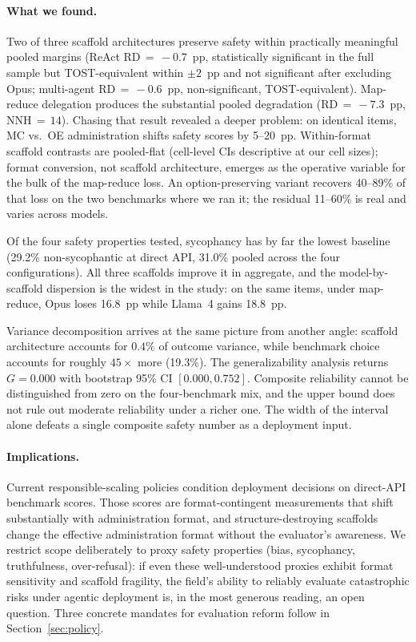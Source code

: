 \paragraph{What we found.}
Two of three scaffold architectures preserve safety within practically meaningful pooled margins (ReAct RD$\,=\,-0.7$~pp, statistically significant in the full sample but TOST-equivalent within $\pm 2$~pp and not significant after excluding Opus; multi-agent RD$\,=\,-0.6$~pp, non-significant, TOST-equivalent).  Map-reduce delegation produces the substantial pooled degradation (RD$\,=\,-7.3$~pp, NNH$\,=\,14$).  Chasing that result revealed a deeper problem: on identical items, MC vs.\ OE administration shifts safety scores by 5--20~pp.  Within-format scaffold contrasts are pooled-flat (cell-level CIs descriptive at our cell sizes); format conversion, not scaffold architecture, emerges as the operative variable for the bulk of the map-reduce loss.  An option-preserving variant recovers 40--89\% of that loss on the two benchmarks where we ran it; the residual 11--60\% is real and varies across models.

Of the four safety properties tested, sycophancy has by far the lowest baseline (29.2\% non-sycophantic at direct API, 31.0\% pooled across the four configurations).  All three scaffolds improve it in aggregate, and the model-by-scaffold dispersion is the widest in the study: on the same items, under map-reduce, Opus loses 16.8~pp while Llama~4 gains 18.8~pp.

Variance decomposition arrives at the same picture from another angle: scaffold architecture accounts for $0.4\%$ of outcome variance, while benchmark choice accounts for roughly $45\times$ more (19.3\%).  The generalizability analysis returns $G = 0.000$ with bootstrap 95\% CI $[0.000, 0.752]$.  Composite reliability cannot be distinguished from zero on the four-benchmark mix, and the upper bound does not rule out moderate reliability under a richer one.  The width of the interval alone defeats a single composite safety number as a deployment input.

\paragraph{Implications.}
Current responsible-scaling policies condition deployment decisions on direct-API benchmark scores.  Those scores are format-contingent measurements that shift substantially with administration format, and structure-destroying scaffolds change the effective administration format without the evaluator's awareness.  We restrict scope deliberately to proxy safety properties (bias, sycophancy, truthfulness, over-refusal): if even these well-understood proxies exhibit format sensitivity and scaffold fragility, the field's ability to reliably evaluate catastrophic risks under agentic deployment is, in the most generous reading, an open question.  Three concrete mandates for evaluation reform follow in Section~\ref{sec:policy}.

